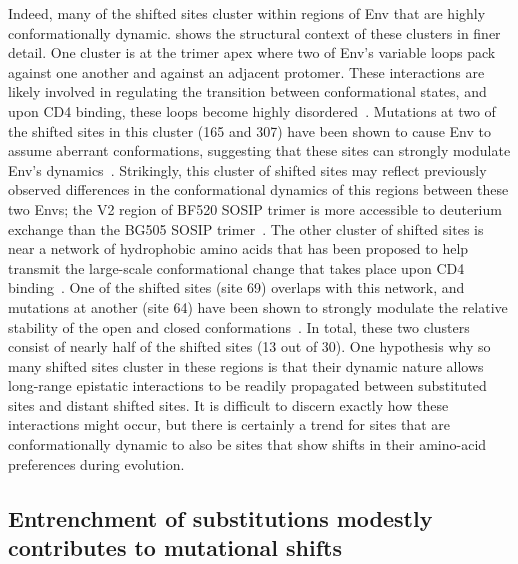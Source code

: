 \documentclass[9pt]{elife}
\begin{document}
Indeed, many of the shifted sites cluster within regions of Env that are highly conformationally dynamic.
 shows the structural context of these clusters in finer detail.
One cluster is at the trimer apex where two of Env's variable loops pack against one another and against an adjacent protomer.
These interactions are likely involved in regulating the transition between conformational states, and upon CD4 binding, these loops become highly disordered~\citep{guttman2014cd4,ozorowski2017open}.
Mutations at two of the shifted sites in this cluster (165 and 307) have been shown to cause Env to assume aberrant conformations, suggesting that these sites can strongly modulate Env's dynamics~\citep{lee2017broadly}.
Strikingly, this cluster of shifted sites may reflect previously observed differences in the conformational dynamics of this regions between these two Envs; the V2 region of BF520 SOSIP trimer is more accessible to deuterium exchange than the BG505 SOSIP trimer~\citep{verkerke2016epitope}.
The other cluster of shifted sites is near a network of hydrophobic amino acids that has been proposed to help transmit the large-scale conformational change that takes place upon CD4 binding~\citep{ozorowski2017open}.
One of the shifted sites (site 69) overlaps with this network, and mutations at another (site 64) have been shown to strongly modulate the relative stability of the open and closed conformations~\citep{de2015immunogenicity}.
In total, these two clusters consist of nearly half of the shifted sites (13 out of 30).
One hypothesis why so many shifted sites cluster in these regions is that their dynamic nature allows long-range epistatic interactions to be readily propagated between substituted sites and distant shifted sites.
It is difficult to discern exactly how these interactions might occur, but there is certainly a trend for sites that are conformationally dynamic to also be sites that show shifts in their amino-acid preferences during evolution.

\subsection{Entrenchment of substitutions modestly contributes to mutational shifts}
\end{document}
